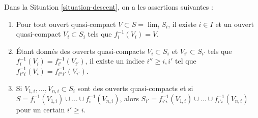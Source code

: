 \begin{lemma}
\label{lemma-descend-opens}
Dans la Situation \ref{situation-descent}, on a les assertions suivantes :
\begin{enumerate}
\item Pour tout ouvert quasi-compact $V \subset S = \lim_i S_i$, il existe
$i \in I$ et un ouvert quasi-compact $V_i \subset S_i$ tels que
$f_i^{-1}(V_i) = V$.
\item Étant donnés des ouverts quasi-compacts $V_i \subset S_i$ et
$V_{i'} \subset S_{i'}$ tels que
$f_i^{-1}(V_i) = f_{i'}^{-1}(V_{i'})$, il existe un indice
$i'' \geq i, i'$ tel que
$f_{i''i}^{-1}(V_i) = f_{i''i'}^{-1}(V_{i'})$.
\item Si $V_{1, i}, \ldots, V_{n, i} \subset S_i$ sont des ouverts
quasi-compacts et si
$S = f_i^{-1}(V_{1, i}) \cup \ldots \cup f_i^{-1}(V_{n, i})$, alors
$S_{i'} = f_{i'i}^{-1}(V_{1, i}) \cup \ldots \cup f_{i'i}^{-1}(V_{n, i})$
pour un certain $i' \geq i$.
\end{enumerate}
\end{lemma}


